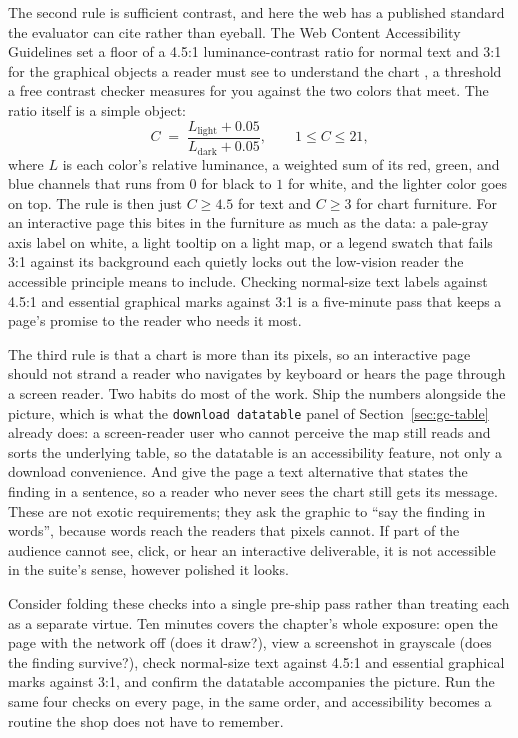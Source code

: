 The second rule is sufficient contrast, and here the web has a published standard the evaluator can cite rather than eyeball. The Web Content Accessibility Guidelines set a floor of a 4.5:1 luminance-contrast ratio for normal text and 3:1 for the graphical objects a reader must see to understand the chart \parencite{w3c2018wcag}, a threshold a free contrast checker measures for you against the two colors that meet. The ratio itself is a simple object:
\[
  C \;=\; \frac{L_{\text{light}} + 0.05}{L_{\text{dark}} + 0.05},
  \qquad 1 \le C \le 21,
\]
where $L$ is each color's relative luminance, a weighted sum of its red, green, and blue channels that runs from $0$ for black to $1$ for white, and the lighter color goes on top. The rule is then just $C \ge 4.5$ for text and $C \ge 3$ for chart furniture. For an interactive page this bites in the furniture as much as the data: a pale-gray axis label on white, a light tooltip on a light map, or a legend swatch that fails 3:1 against its background each quietly locks out the low-vision reader the accessible principle means to include. Checking normal-size text labels against 4.5:1 and essential graphical marks against 3:1 is a five-minute pass that keeps a page's promise to the reader who needs it most.

The third rule is that a chart is more than its pixels, so an interactive page should not strand a reader who navigates by keyboard or hears the page through a screen reader. Two habits do most of the work. Ship the numbers alongside the picture, which is what the \texttt{download datatable} panel of Section~\ref{sec:gc-table} already does: a screen-reader user who cannot perceive the map still reads and sorts the underlying table, so the datatable is an accessibility feature, not only a download convenience. And give the page a text alternative that states the finding in a sentence, so a reader who never sees the chart still gets its message. These are not exotic requirements; they ask the graphic to \enquote{say the finding in words}, because words reach the readers that pixels cannot. If part of the audience cannot see, click, or hear an interactive deliverable, it is not accessible in the suite's sense, however polished it looks.

Consider folding these checks into a single pre-ship pass rather than treating each as a separate virtue. Ten minutes covers the chapter's whole exposure: open the page with the network off (does it draw?), view a screenshot in grayscale (does the finding survive?), check normal-size text against 4.5:1 and essential graphical marks against 3:1, and confirm the datatable accompanies the picture. Run the same four checks on every page, in the same order, and accessibility becomes a routine the shop does not have to remember.

